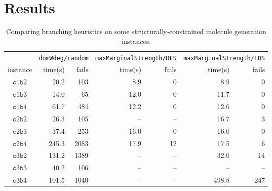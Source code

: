 \documentclass[../Document.tex]{subfiles}
\begin{document}
\section{Results}

\begin{table}[]
    \centering
    \begin{tabular}{crrrrrr}
    \hline
      & \multicolumn{2}{c}{\texttt{domWdeg/random}} &  \multicolumn{2}{c}{\texttt{maxMarginalStrength/DFS}} & \multicolumn{2}{c}{\texttt{maxMarginalStrength/LDS}}\\
      instance & time(s) & fails & time(s) & fails & time(s) & fails \\
    \hline
     $\mathtt{c}1\mathtt{b}2$ & 20.2 & 103 &  8.9 & 0 & 8.9 & 0\\
     $\mathtt{c}1\mathtt{b}3$ & 14.0 & 65 &  12.0 & 0 & 11.7 & 0\\
     $\mathtt{c}1\mathtt{b}4$ & 61.7 & 484 & 12.2 & 0 & 12.6 & 0\\
     $\mathtt{c}2\mathtt{b}2$ & 26.3 & 105 &  -- & -- & 16.7 & 3\\
     $\mathtt{c}2\mathtt{b}3$ & 37.4 & 253 & 16.0 & 0 & 16.0 & 0\\
     $\mathtt{c}2\mathtt{b}4$ & 245.3 & 2083 &  17.9 & 12 & 17.5 & 6\\
     $\mathtt{c}3\mathtt{b}2$ & 131.2 & 1389 & -- & -- & 32.0 & 14\\
     $\mathtt{c}3\mathtt{b}3$ & 40.2 & 106 &  -- & -- & -- & --\\
     $\mathtt{c}3\mathtt{b}4$ & 101.5 & 1040 &  -- & -- & 498.8 & 247\\
    \hline
    \end{tabular}
    \caption{Comparing branching heuristics on some structurally-constrained molecule generation instances.}
    \label{tab:results}
\end{table}
\end{document}
